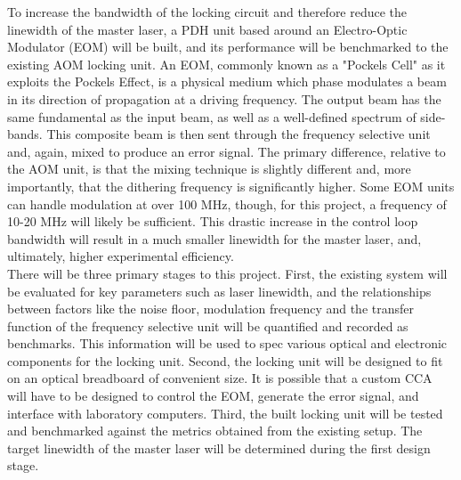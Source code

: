 \noindent To increase the bandwidth of the locking circuit and therefore 
reduce the linewidth of the master laser, a PDH unit based around an 
Electro-Optic Modulator (EOM) will be built, and its performance will be 
benchmarked to the existing AOM locking unit. An EOM, commonly known as 
a "Pockels Cell" as it exploits the Pockels Effect, is a physical medium 
which phase modulates a beam in its direction of propagation at a 
driving frequency. The output beam has the same fundamental as the input 
beam, as well as a well-defined spectrum of side-bands. This composite 
beam is then sent through the frequency selective unit and, again, mixed 
to produce an error signal. The primary difference, relative to the AOM 
unit, is that the mixing technique is slightly different and, more 
importantly, that the dithering frequency is significantly higher. Some 
EOM units can handle modulation at over 100 MHz, though, for this 
project, a frequency of 10-20 MHz will likely be sufficient. This 
drastic increase in the control loop bandwidth will result in a much 
smaller linewidth for the master laser, and, ultimately, higher 
experimental efficiency. \\

\noindent There will be three primary stages to this project. First, the 
existing system will be evaluated for key parameters such as laser 
linewidth, and the relationships between factors like the noise floor,
modulation frequency and the transfer function of the frequency selective
unit will be quantified and recorded as benchmarks. This information 
will be used to spec various optical and electronic components for the
locking unit. Second, the locking unit will be designed to fit on an 
optical breadboard of convenient size. It is possible that a custom CCA 
will have to be designed to control the EOM, generate the error signal, 
and interface with laboratory computers. Third, the built locking unit 
will be tested and benchmarked against the metrics obtained from the 
existing setup. The target linewidth of the master laser will be determined during the first design stage.
 
